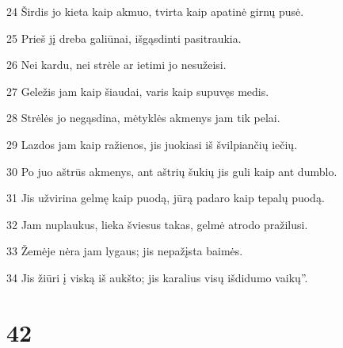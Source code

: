 \par 24 Širdis jo kieta kaip akmuo, tvirta kaip apatinė girnų pusė. 
\par 25 Prieš jį dreba galiūnai, išgąsdinti pasitraukia. 
\par 26 Nei kardu, nei strėle ar ietimi jo nesužeisi. 
\par 27 Geležis jam kaip šiaudai, varis kaip supuvęs medis. 
\par 28 Strėlės jo negąsdina, mėtyklės akmenys jam tik pelai. 
\par 29 Lazdos jam kaip ražienos, jis juokiasi iš švilpiančių iečių. 
\par 30 Po juo aštrūs akmenys, ant aštrių šukių jis guli kaip ant dumblo. 
\par 31 Jis užvirina gelmę kaip puodą, jūrą padaro kaip tepalų puodą. 
\par 32 Jam nuplaukus, lieka šviesus takas, gelmė atrodo pražilusi. 
\par 33 Žemėje nėra jam lygaus; jis nepažįsta baimės. 
\par 34 Jis žiūri į viską iš aukšto; jis karalius visų išdidumo vaikų”.



\chapter{42}


